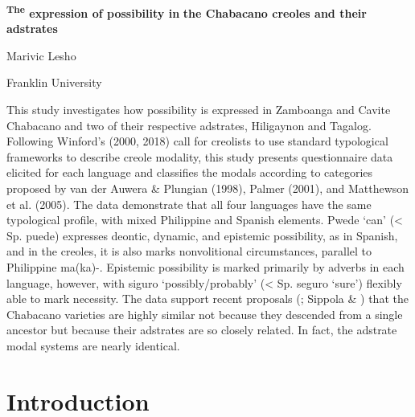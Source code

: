 

\begin{stylelsAbstract}
\textbf{\textup{\textsuperscript{The} \textbf{expression} \textbf{of} \textbf{possibility} \textbf{in} }}\textbf{\textup{the} \textbf{Chabacano} \textbf{creoles} \textbf{and} \textbf{their} \textbf{adstrates} }
\end{stylelsAbstract}

\begin{stylelsAbstract}
\textup{Marivic Lesho}
\end{stylelsAbstract}

\begin{stylelsAbstract}
\textup{Franklin University}
\end{stylelsAbstract}

\begin{stylelsAbstract}
\textup{This study investigates how possibility is expressed in Zamboanga and Cavite Chabacano and two of their respective adstrates, Hiligaynon and Tagalog. Following} \textup{W}\textup{inford's (2000, 2018)} \textup{call for creolists to use standard typological frameworks to describe creole modality, this study presents questionnaire data elicited for each language and classifies the modals according to categories proposed by} \textup{v}\textup{an der Auwera \& Plungian (1998}), \textup{P}\textup{almer (2001}\textup{), and} \textup{M}\textup{atthewson et al. (2005}\textup{). The data demonstrate that all four languages have the same typological profile, with mixed Philippine and Spanish elements.} Pwede \textup{‘can’ (< Sp.} puede) \textup{expresses deontic, dynamic, and epistemic possibility, as in Spanish, and in the creoles, it is also marks nonvolitional circumstances, parallel to Philippine} ma(ka)-\textup{. Epistemic possibility is marked primarily by adverbs in each language, however, with} siguro \textup{‘possibly/probably’ (< Sp.} seguro \textup{‘sure’) flexibly able to mark necessity. The data support recent proposals} (\textup{\citealt{Fernández2006,2012a2006};} \textup{S}\textup{ippola \& \citealt{Lesho2020})} \textup{that the Chabacano varieties are highly similar not because they descended from a single ancestor but because their adstrates are so closely related. In fact, the adstrate modal systems are nearly identical.}
\end{stylelsAbstract}

\section{Introduction}


